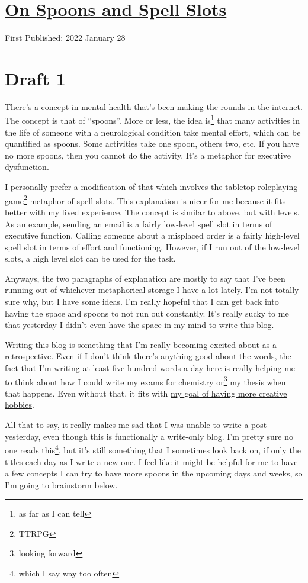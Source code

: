\documentclass[12pt]{article}[titlepage]
\newcommand{\say}[1]{``#1''}
\newcommand{\1}{\={a}}
\newcommand{\2}{\={e}}
\newcommand{\3}{\={\i}}
\newcommand{\4}{\=o}
\newcommand{\5}{\=u}
\newcommand{\6}{\={A}}
\renewcommand{\,}{\textsuperscript{,}}
\begin{document}
\doublespacing
\section{\href{spoons-and-spell-slots.html}{On Spoons and Spell Slots}}
First Published: 2022 January 28

\section{Draft 1}
There's a concept in mental health that's been making the rounds in the internet.
The concept is that of \say{spoons}.
More or less, the idea is\footnote{as far as I can tell} that many activities in the life of someone with a neurological condition take mental effort, which can be quantified as spoons.
Some activities take one spoon, others two, etc.
If you have no more spoons, then you cannot do the activity.
It's a metaphor for executive dysfunction.

I personally prefer a modification of that which involves the tabletop roleplaying game\footnote{TTRPG} metaphor of spell slots.
This explanation is nicer for me because it fits better with my lived experience.
The concept is similar to above, but with levels.
As an example, sending an email is a fairly low-level spell slot in terms of executive function.
Calling someone about a misplaced order is a fairly high-level spell slot in terms of effort and functioning.
However, if I run out of the low-level slots, a high level slot can be used for the task.

Anyways, the two paragraphs of explanation are mostly to say that I've been running out of whichever metaphorical storage I have a lot lately.
I'm not totally sure why, but I have some ideas.
I'm really hopeful that I can get back into having the space and spoons to not run out constantly.
It's really sucky to me that yesterday I didn't even have the space in my mind to write this blog.

Writing this blog is something that I'm really becoming excited about as a retrospective.
Even if I don't think there's anything good about the words, the fact that I'm writing at least five hundred words a day here is really helping me to think about how I could write my exams for chemistry or\footnote{looking forward} my thesis when that happens.
Even without that, it fits with \href{creative-hobbies.html}{my goal of having more creative hobbies}.

All that to say, it really makes me sad that I was unable to write a post yesterday, even though this is functionally a write-only blog. 
I'm pretty sure no one reads this\footnote{which I say way too often}, but it's still something that I sometimes look back on, if only the titles each day as I write a new one.
I feel like it might be helpful for me to have a few concepts I can try to have more spoons in the upcoming days and weeks, so I'm going to brainstorm below.
\end{document}
